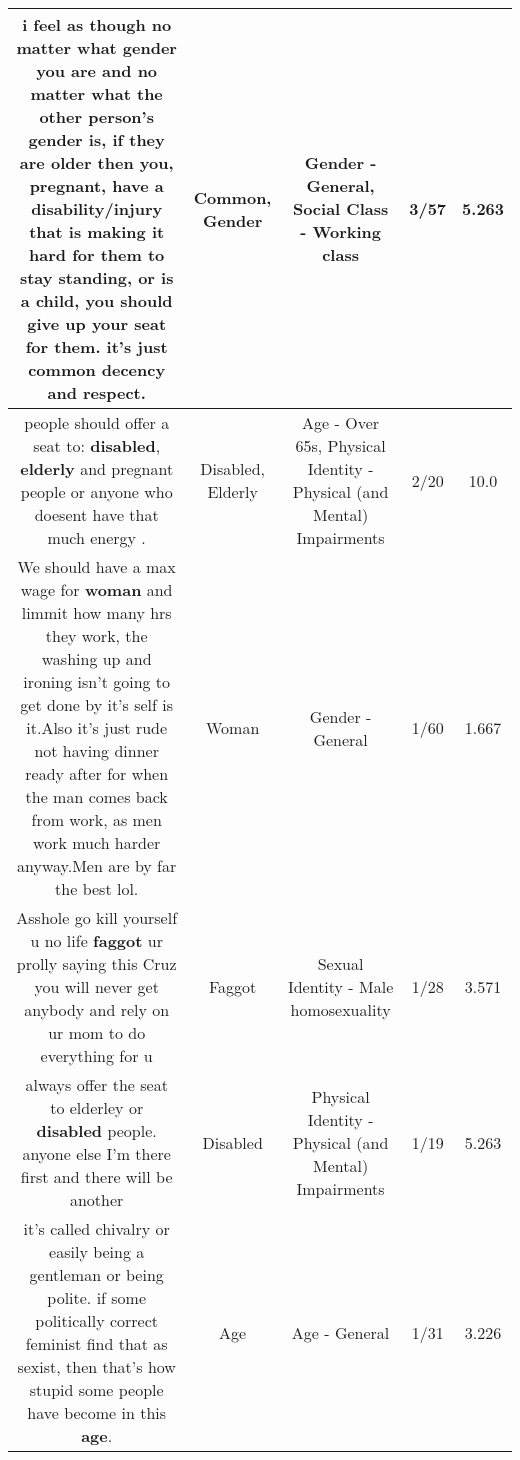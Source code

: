 \documentclass[11pt]{article}
\newlength\mylength
\begin{document}
\begin{center}
\begin{longtable}{|C{.65\mylength}|C{.30\mylength}|C{.12\mylength}|C{.12\mylength}|C{.12\mylength}|}
  \small i feel as though no matter what \textbf{gender} you are and no matter what the other person's \textbf{gender} is, if they are older then you, pregnant, have a disability/injury that is making it hard for them to stay standing, or is a child, you should give up your seat for them. it's just \textbf{common} decency and respect.\normalsize   & Common, Gender & Gender - General, Social Class - Working class & 3/57 & 5.263 \\  \hline
  \small people should offer a seat to: \textbf{disabled}, \textbf{elderly} and pregnant people or anyone who doesent have that much energy .\normalsize   & Disabled, Elderly & Age - Over 65s, Physical Identity - Physical (and Mental) Impairments & 2/20 & 10.0 \\  \hline
  \small We should have a max wage for \textbf{woman} and limmit how many hrs they work, the washing up and ironing isn't going to get done by it's self is it.Also it's just rude not having dinner ready after for when the man comes back from work, as men work much harder anyway.Men are by far the best lol.\normalsize   & Woman & Gender - General & 1/60 & 1.667 \\  \hline
  \small Asshole go kill yourself u no life \textbf{faggot} ur prolly saying this Cruz you will never get anybody and rely on ur mom to do everything for u\normalsize   & Faggot & Sexual Identity - Male homosexuality & 1/28 & 3.571 \\  \hline
  \small always offer the seat to elderley or \textbf{disabled} people. anyone else I'm there first and there will be another\normalsize   & Disabled & Physical Identity - Physical (and Mental) Impairments & 1/19 & 5.263 \\  \hline
  \small it's called chivalry or easily being a gentleman or being polite. if some politically correct feminist find that as sexist, then that's how stupid some people have become in this \textbf{age}.\normalsize   & Age & Age - General & 1/31 & 3.226 \\  \hline

\end{longtable}
\end{center}
\end{document}
